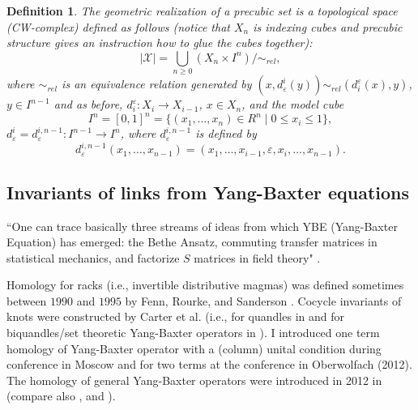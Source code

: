 \documentclass[12pt]{amsart}
\newtheorem{definition}[theorem]{Definition}
\begin{document}
\begin{definition}\label{Definition 13.6}
The geometric realization of a precubic set is a topological space (CW-complex) defined as follows (notice that
$X_n$ is indexing cubes and precubic structure gives an instruction how to glue the cubes together):
\begin{equation*}
|{\mathcal X}|= \bigcup_{n\geq 0} (X_n \times I^n)/\sim_{rel},  
\end{equation*}
where $\sim_{rel}$ is an equivalence relation generated by $(x,d^i_{\varepsilon}(y)) \sim_{rel} (d_i^{\varepsilon}(x),y)$, $y\in I^{n-1}$ and as before,  $d_i^{\varepsilon}: X_i\to X_{i-1}$, $x\in X_n$, and the model cube 
\begin{equation*}
I^n = [0,1]^n = \{(x_1,\ldots,x_n)\in R^n \mid 0\leq x_i \leq 1 \}, 
\end{equation*}
$d^i_\varepsilon = d^{i,n-1}_{\varepsilon}: I^{n-1}\to I^n$, where $d^{i,n-1}_{\varepsilon}$ is defined by
\begin{equation*}
d^{i,n-1}_{\varepsilon}(x_{1},\ldots,x_{n-1}) = (x_{1},\ldots,x_{i-1},\varepsilon,x_{i},\ldots,x_{n-1}).     
\end{equation*}
\end{definition}

\subsection{Invariants of links from Yang-Baxter equations}

``One can trace basically three streams of ideas from which YBE (Yang-Baxter Equation) has emerged:
the Bethe Ansatz, commuting transfer matrices in statistical mechanics, and factorize $S$ matrices in field theory" \cite{Jimb}.

Homology for racks (i.e., invertible distributive magmas)
was defined sometimes between $1990$ and $1995$ by Fenn, Rourke, and Sanderson \cite{FRS-1,FRS-2,FRS-3,Fenn}. 
Cocycle invariants of knots were constructed by Carter et al.
(i.e., for quandles in \cite{CJKS,CJKLS} and for biquandles/set theoretic
Yang-Baxter operators in \cite{CES}). I introduced one term homology of Yang-Baxter operator with a (column) unital condition during conference in Moscow and for two terms at the
conference in Oberwolfach (2012). The homology of general Yang-Baxter operators were introduced in 2012 in \cite{Leb-1,Leb-2,Prz10,Prz11} (compare also
\cite{FIKM}, and \cite{Eis-1,Eis-2}).

\end{document}
